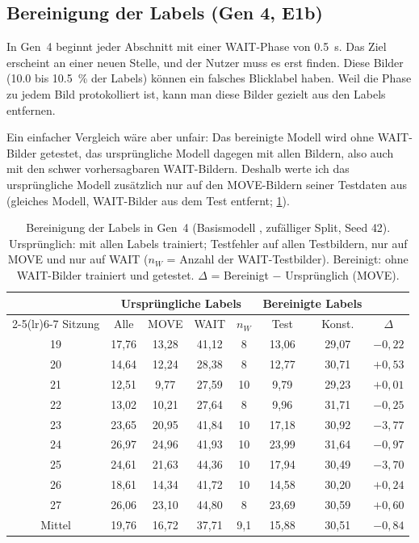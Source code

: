 \subsection{Bereinigung der Labels (Gen 4, E1b)}
\label{sec:cleaning}

In Gen~4 beginnt jeder Abschnitt mit einer WAIT-Phase von \SI{0,5}{\second}.
Das Ziel erscheint an einer neuen Stelle, und der Nutzer muss es erst finden.
Diese Bilder (\SI{10,0}{} bis \SI{10,5}{\percent} der Labels) können ein
falsches Blicklabel haben. Weil die Phase zu jedem Bild protokolliert ist,
kann man diese Bilder gezielt aus den Labels entfernen.

Ein einfacher Vergleich wäre aber unfair: Das bereinigte Modell wird ohne
WAIT-Bilder getestet, das ursprüngliche Modell dagegen mit allen Bildern,
also auch mit den schwer vorhersagbaren WAIT-Bildern. Deshalb werte ich das
ursprüngliche Modell zusätzlich nur auf den MOVE-Bildern seiner Testdaten aus
(gleiches Modell, WAIT-Bilder aus dem Test entfernt; \cref{tab:cleaning}).

\begin{table}[htbp]
  \centering
  \caption[Bereinigung der Labels in Gen~4]{Bereinigung der Labels in Gen~4 (Basismodell ,
           zufälliger Split, Seed 42). Ursprünglich: mit allen Labels
           trainiert; Testfehler auf allen Testbildern, nur auf MOVE und nur
           auf WAIT ($n_W$ = Anzahl der WAIT-Testbilder). Bereinigt: ohne
           WAIT-Bilder trainiert und getestet. $\Delta$ = Bereinigt $-$
           Ursprünglich (MOVE).}
  \label{tab:cleaning}
  \footnotesize
  \setlength{\tabcolsep}{4pt}
  \begin{tabular}{c cccc cc c}
    \toprule
    & \multicolumn{4}{c}{Ursprüngliche Labels} & \multicolumn{2}{c}{Bereinigte Labels} & \\
    \cmidrule(lr){2-5}\cmidrule(lr){6-7}
    Sitzung & Alle & MOVE & WAIT & $n_W$ & Test & Konst. & $\Delta$ \\
    \midrule
    19 & 17,76 & 13,28 & 41,12 & 8  & 13,06 & 29,07 & $-0,22$ \\
    20 & 14,64 & 12,24 & 28,38 & 8  & 12,77 & 30,71 & $+0,53$ \\
    21 & 12,51 &  9,77 & 27,59 & 10 &  9,79 & 29,23 & $+0,01$ \\
    22 & 13,02 & 10,21 & 27,64 & 8  &  9,96 & 31,71 & $-0,25$ \\
    23 & 23,65 & 20,95 & 41,84 & 10 & 17,18 & 30,92 & $-3,77$ \\
    24 & 26,97 & 24,96 & 41,93 & 10 & 23,99 & 31,64 & $-0,97$ \\
    25 & 24,61 & 21,63 & 44,36 & 10 & 17,94 & 30,49 & $-3,70$ \\
    26 & 18,61 & 14,34 & 41,72 & 10 & 14,58 & 30,20 & $+0,24$ \\
    27 & 26,06 & 23,10 & 44,80 & 8  & 23,69 & 30,59 & $+0,60$ \\
    \midrule
    Mittel & 19,76 & 16,72 & 37,71 & 9,1 & 15,88 & 30,51 & $-0,84$ \\
    \bottomrule
  \end{tabular}
\end{table}

